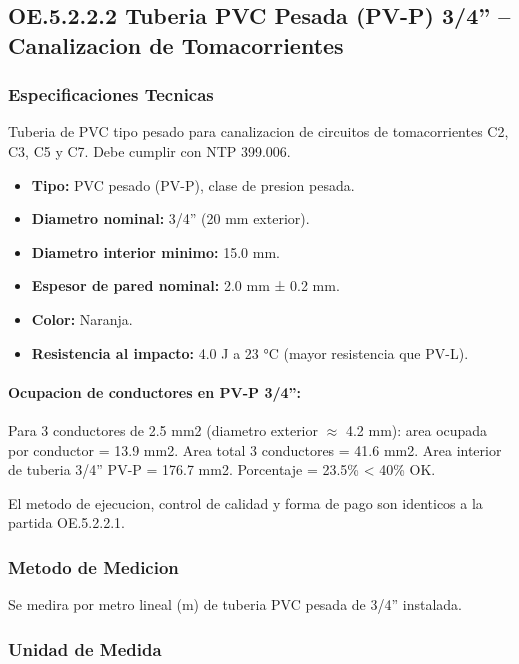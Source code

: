 \subsection{OE.5.2.2.2 Tuberia PVC Pesada (PV-P) 3/4'' -- Canalizacion de Tomacorrientes}

\subsubsection{Especificaciones Tecnicas}

Tuberia de PVC tipo pesado para canalizacion de circuitos de tomacorrientes C2, C3, C5 y C7. Debe cumplir con NTP 399.006.

\begin{itemize}[nosep]
  \item \textbf{Tipo:} PVC pesado (PV-P), clase de presion pesada.
  \item \textbf{Diametro nominal:} 3/4'' (20 mm exterior).
  \item \textbf{Diametro interior minimo:} 15.0 mm.
  \item \textbf{Espesor de pared nominal:} 2.0 mm ± 0.2 mm.
  \item \textbf{Color:} Naranja.
  \item \textbf{Resistencia al impacto:} 4.0 J a 23 °C (mayor resistencia que PV-L).
\end{itemize}

\paragraph{Ocupacion de conductores en PV-P 3/4'':}
Para 3 conductores de 2.5 mm2 (diametro exterior $\approx$ 4.2 mm): area ocupada por conductor = 13.9 mm2. Area total 3 conductores = 41.6 mm2. Area interior de tuberia 3/4'' PV-P = 176.7 mm2. Porcentaje = 23.5\% < 40\% OK.

El metodo de ejecucion, control de calidad y forma de pago son identicos a la partida OE.5.2.2.1.

\subsubsection{Metodo de Medicion}

Se medira por metro lineal (m) de tuberia PVC pesada de 3/4'' instalada.

\subsubsection{Unidad de Medida}

